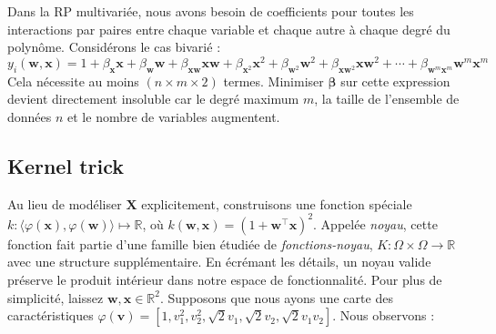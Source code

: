 {Dans la RP multivariée, nous avons besoin de coefficients pour toutes les interactions par paires entre chaque variable et chaque autre à chaque degré du polynôme. Considérons le cas bivarié :
%
\begin{equation}
    y_i(\mathbf w, \mathbf x) = 1 + \beta_{\mathbf x} \mathbf x + \beta_{\mathbf w}\mathbf w + \beta_{\mathbf x\mathbf w} \mathbf x\mathbf w + \beta_{\mathbf x^2} \mathbf x^2 + \beta_{\mathbf w^2} \mathbf w^2 + \beta_{\mathbf x\mathbf w^2} \mathbf x\mathbf w^2 + \cdots + \beta_{\mathbf w^m\mathbf x^m} \mathbf w^m\mathbf x^m
\end{equation}
%
Cela nécessite au moins $(n \times m \times 2)$ termes. Minimiser $\bm\beta$ sur cette expression devient directement insoluble car le degré maximum $m$, la taille de l'ensemble de données $n$ et le nombre de variables augmentent.

\subsection{Kernel trick}

Au lieu de modéliser $\mathbf X$ explicitement, construisons une fonction spéciale $k : \langle\varphi(\mathbf x), \varphi(\mathbf w)\rangle \mapsto \mathbb R$, où $k(\mathbf w, \mathbf x) = (1 + \mathbf w^\intercal \mathbf x)^2$. Appelée \textit{noyau}, cette fonction fait partie d'une famille bien étudiée de \textit{fonctions-noyau}, $K : \Omega \times \Omega \rightarrow \mathbb R$ avec une structure supplémentaire. En écrémant les détails, un noyau valide préserve le produit intérieur dans notre espace de fonctionnalité. Pour plus de simplicité, laissez $\mathbf w, \mathbf x \in \mathbb R^2$. Supposons que nous ayons une carte des caractéristiques $\varphi(\mathbf v) = \left[1, v_1^2, v_2^2, \sqrt{2} v_1, \sqrt{2} v_2, \sqrt{2} v_1 v_2\right]$. Nous observons :

}
